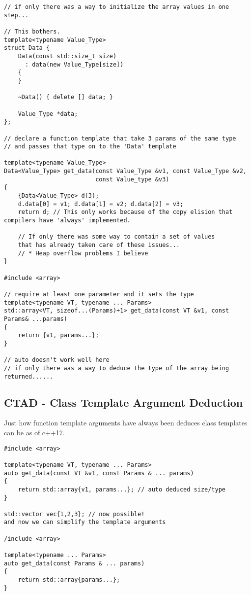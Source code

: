 \documentclass[openany]{report}
\begin{document}
\begin{verbatim}
// if only there was a way to initialize the array values in one step...

// This bothers.
template<typename Value_Type>
struct Data {
    Data(const std::size_t size)
      : data(new Value_Type[size])
    {
    }

    ~Data() { delete [] data; }

    Value_Type *data;
};

// declare a function template that take 3 params of the same type
// and passes that type on to the 'Data' template

template<typename Value_Type>
Data<Value_Type> get_data(const Value_Type &v1, const Value_Type &v2,
                          const Value_type &v3)
{
    {Data<Value_Type> d(3);
    d.data[0] = v1; d.data[1] = v2; d.data[2] = v3;
    return d; // This only works because of the copy elision that compilers have 'always' implemented.

    // If only there was some way to contain a set of values
    that has already taken care of these issues...  
    // * Heap overflow problems I believe
}

#include <array>

// require at least one parameter and it sets the type
template<typename VT, typename ... Params>
std::array<VT, sizeof...(Params)+1> get_data(const VT &v1, const Params& ...params)
{
    return {v1, params...};
}

// auto doesn't work well here
// if only there was a way to deduce the type of the array being returned......
\end{verbatim}

\subsection{CTAD - Class Template Argument Deduction}

Just how function template arguments have always been deduces class templates can be as of c++17.

\begin{verbatim}
#include <array>

template<typename VT, typename ... Params>
auto get_data(const VT &v1, const Params & ... params)
{
    return std::array{v1, params...}; // auto deduced size/type
}

std::vector vec{1,2,3}; // now possible! 
and now we can simplify the template arguments

/include <array>

template<typename ... Params>
auto get_data(const Params & ... params)
{
    return std::array{params...};
}
\end{verbatim}
\end{document}
